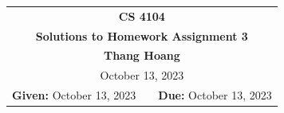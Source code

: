 \documentclass[11pt,twoside]{article}
\newcommand{\coursenumber}{CS 4104}
\newcommand{\docdate}{October 02, 2023}
\newcommand{\duedate}{October 13, 2023}
\newcommand{\homeworknumber}{3}
\newcommand{\doctitle}{Solutions to Homework Assignment \homeworknumber}
\newcommand{\doctitle}{Homework Assignment \homeworknumber}
\renewcommand{\docdate}{\duedate}
\renewcommand{\author}{Thang Hoang}
\begin{document}
\thispagestyle{empty}

\begin{center}
\begin{tabular}{lcr}
\multicolumn{3}{c}{\Large\textbf{\coursenumber}}
\\[0.04in]
\multicolumn{3}{c}{\Large\textbf{\doctitle}}
\ifthenelse{\boolean{solutions}}{%
\\[0.04in]\multicolumn{3}{c}{\large\textbf{\author}}
}{} %
\ifthenelse{\boolean{solutions}}{%
\\[0.10in]\multicolumn{3}{c}{\duedate}
}{%
\\[0.10in]
\textbf{Given:} \docdate
& \hspace*{1.0in} &
\textbf{Due:} \duedate
}
\end{tabular}
\end{center}
\end{document}
